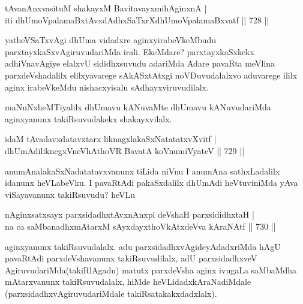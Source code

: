 \begin{shl}
tAvanAnxvasituM shakayxM BavitavayxmihAginxnA | \\
iti dhUmoVpalamaBxtAvxdAdhxSaTxrXdhUmoVpalamaBxvatf \hfill||  728 ||  
\end{shl}

\begin{artha}
yatheVSaTxvAgi dhUma vidadxre aginxyirabeVkeMbudu parxtayxkaSxvAgiruvudariMda irali. EkeMdare? parxtayxkaSxkekx adhiVnavAgiye elalxvU sididhxsuvudu adariMda Adare pavaRta meVlina parxdeVshadalilx elilxyavarege sAkASxtAtxgi noVDuvudalalxvo aduvarege ililx aginx irabeVkeMdu nishacxyisalu sAdhayxviruvudilalx.
\end{artha}

\begin{artha}
maNuNxheMTiyalilx dhUmavu kANuvaMte dhUmavu kANuvudariMda aginxyanunx takiRsuvudakekx shakayxvilalx.
\end{artha}

\begin{shl}
idaM tAvadavxdatavxtarx liknagxlakaSxNatatatxvXvitf | \\
dhUmAdiliknegxVneVhAthoVR BavatA koV\s numiVyateV \hfill||  729 ||  
\end{shl}


\begin{artha}
anumAnalakaSxNadatatavxvanunx tiLida niVnu  I anumAna sathxLadalilx idanunx heVLabeVku. I pavaRtAdi pakaSxdalilx dhUmAdi heVtuviniMda yAva viSayavanunx takiRsuvudu? heVLu
\end{artha}

\begin{shl}
nAginxsatxsayx parxsidadhxtAvxnAnxpi deVshaH parxsididhxtaH | \\
na ca saMbanadhxmAtarxM sAyxdayxthoVkAtxdeVva kAraNAtf \hfill||  730 ||  
\end{shl}

\begin{artha}
aginxyanunx takiRsuvudalalx. adu parxsidadhxvAgideyAdadxriMda hAgU pavaRtAdi parxdeVshavanunx takiRsuvudilalx, adU parxsidadhxveV AgiruvudariMda(takiRlAgadu) matutx parxdeVsha aginx ivugaLa saMbaMdha mAtarxvanunx takiRsuvudalalx, hiMde heVLidadxkAraNadiMdale (parxsidadhxvAgiruvudariMdale takiRsatakakxdadxlalx).
\end{artha}


